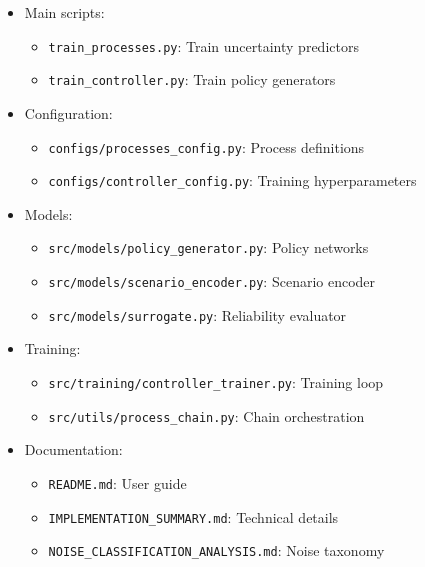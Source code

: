 \documentclass[11pt,a4paper]{article}
\begin{document}
\begin{itemize}
    \item Main scripts:
    \begin{itemize}
        \item \texttt{train\_processes.py}: Train uncertainty predictors
        \item \texttt{train\_controller.py}: Train policy generators
    \end{itemize}

    \item Configuration:
    \begin{itemize}
        \item \texttt{configs/processes\_config.py}: Process definitions
        \item \texttt{configs/controller\_config.py}: Training hyperparameters
    \end{itemize}

    \item Models:
    \begin{itemize}
        \item \texttt{src/models/policy\_generator.py}: Policy networks
        \item \texttt{src/models/scenario\_encoder.py}: Scenario encoder
        \item \texttt{src/models/surrogate.py}: Reliability evaluator
    \end{itemize}

    \item Training:
    \begin{itemize}
        \item \texttt{src/training/controller\_trainer.py}: Training loop
        \item \texttt{src/utils/process\_chain.py}: Chain orchestration
    \end{itemize}

    \item Documentation:
    \begin{itemize}
        \item \texttt{README.md}: User guide
        \item \texttt{IMPLEMENTATION\_SUMMARY.md}: Technical details
        \item \texttt{NOISE\_CLASSIFICATION\_ANALYSIS.md}: Noise taxonomy
    \end{itemize}
\end{itemize}
\end{document}
